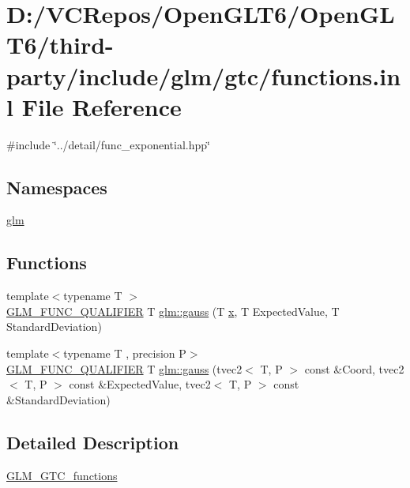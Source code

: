 \hypertarget{functions_8inl}{}\section{D\+:/\+V\+C\+Repos/\+Open\+G\+L\+T6/\+Open\+G\+L\+T6/third-\/party/include/glm/gtc/functions.inl File Reference}
\label{functions_8inl}
{\ttfamily \#include \char`\"{}../detail/func\+\_\+exponential.\+hpp\char`\"{}}\newline
\subsection*{Namespaces}
\begin{DoxyCompactItemize}
\item 
 \mbox{\hyperlink{namespaceglm}{glm}}
\end{DoxyCompactItemize}
\subsection*{Functions}
\begin{DoxyCompactItemize}
\item 
{\footnotesize template$<$typename T $>$ }\\\mbox{\hyperlink{setup_8hpp_a33fdea6f91c5f834105f7415e2a64407}{G\+L\+M\+\_\+\+F\+U\+N\+C\+\_\+\+Q\+U\+A\+L\+I\+F\+I\+ER}} T \mbox{\hyperlink{group__gtc__functions_ga0b50b197ff74261a0fad90f4b8d24702}{glm\+::gauss}} (T \mbox{\hyperlink{glad_8h_a92d0386e5c19fb81ea88c9f99644ab1d}{x}}, T Expected\+Value, T Standard\+Deviation)
\item 
{\footnotesize template$<$typename T , precision P$>$ }\\\mbox{\hyperlink{setup_8hpp_a33fdea6f91c5f834105f7415e2a64407}{G\+L\+M\+\_\+\+F\+U\+N\+C\+\_\+\+Q\+U\+A\+L\+I\+F\+I\+ER}} T \mbox{\hyperlink{group__gtc__functions_ga7448f9eb74bb5924f6330ab532f2899c}{glm\+::gauss}} (tvec2$<$ T, P $>$ const \&Coord, tvec2$<$ T, P $>$ const \&Expected\+Value, tvec2$<$ T, P $>$ const \&Standard\+Deviation)
\end{DoxyCompactItemize}


\subsection{Detailed Description}
\mbox{\hyperlink{group__gtc__functions}{G\+L\+M\+\_\+\+G\+T\+C\+\_\+functions}} 